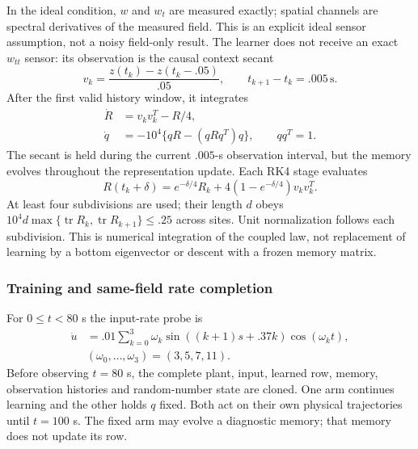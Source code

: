In the ideal condition, $w$ and $w_t$ are measured exactly; spatial channels
are spectral derivatives of the measured field. This is an explicit ideal
sensor assumption, not a noisy field-only result. The learner does not
receive an exact $w_{tt}$ sensor: its observation is the causal context secant
\begin{equation}
 v_k=\frac{z(t_k)-z(t_k-.05)}{.05},\qquad t_{k+1}-t_k=.005\,\mathrm{s}.
 \label{eq:direct_burgers_observation}
\end{equation}
After the first valid history window, it integrates
\begin{equation}
 \begin{aligned}
 \dot R&=v_kv_k^T-R/4,\\
 \dot q&=-10^4\{qR-(qRq^T)q\},\qquad qq^T=1.
 \end{aligned}
 \label{eq:direct_burgers_law}
\end{equation}
The secant is held during the current $.005$-s observation interval, but the
memory evolves throughout the representation update. Each RK4 stage evaluates
\begin{equation}
 R(t_k+\delta)=e^{-\delta/4}R_k+
               4(1-e^{-\delta/4})v_kv_k^T.
 \label{eq:direct_burgers_memory}
\end{equation}
At least four subdivisions are used; their length $d$ obeys
$10^4d\max\{\operatorname{tr}R_k,\operatorname{tr}R_{k+1}\}\leq.25$
across sites. Unit normalization follows each subdivision. This is numerical
integration of the coupled law, not replacement of learning by a bottom
eigenvector or descent with a frozen memory matrix.

\subsubsection{Training and same-field rate completion}
For $0\leq t<80$ s the input-rate probe is
\begin{equation}
 \begin{aligned}
 \dot u&=.01\sum_{k=0}^{3}\omega_k
       \sin((k+1)s+.37k)\cos(\omega_kt),\\
 &(\omega_0,\ldots,\omega_3)=(3,5,7,11).
 \end{aligned}
 \label{eq:direct_burgers_probe}
\end{equation}
Before observing $t=80$ s, the complete plant, input, learned row, memory,
observation histories and random-number state are cloned. One arm continues
learning and the other holds $q$ fixed. Both act on their own physical
trajectories until $t=100$ s. The fixed arm may evolve a diagnostic memory;
that memory does not update its row.

